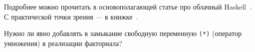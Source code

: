 Подробнее можно прочитать в основополагающей статье про облачный Haskell~\cite{epstein2011towards}.
С практической точки зрения --- в книжке~\cite[глава 16]{marlow2011parallel}.

\begin{task}
    Нужно ли явно добавлять в замыкание свободную переменную \texttt{(*)} (оператор умножения) в реализации факториала?
\end{task}

%
%
%
%
%
%
%
%
%
%
